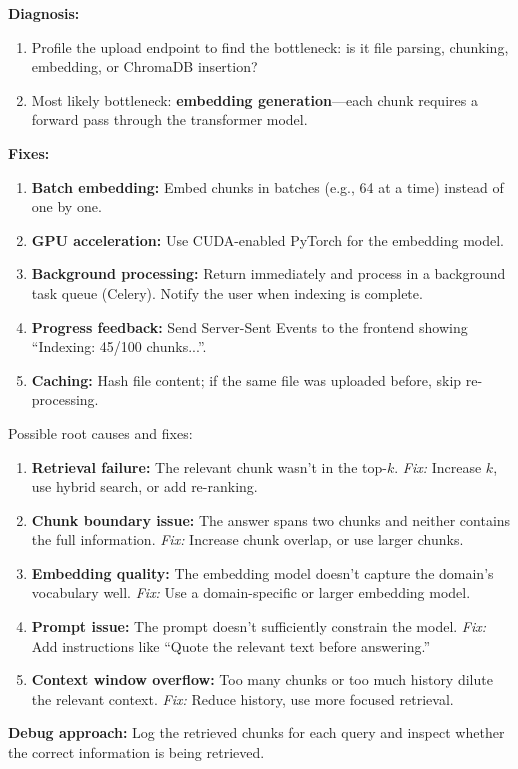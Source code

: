\documentclass[12pt,a4paper]{article}
\begin{document}
\begin{interviewbox}
\end{interviewbox}
\begin{answerbox}
\textbf{Diagnosis:}
\begin{enumerate}
  \item Profile the upload endpoint to find the bottleneck: is it file parsing, chunking, embedding, or ChromaDB insertion?
  \item Most likely bottleneck: \textbf{embedding generation}—each chunk requires a forward pass through the transformer model.
\end{enumerate}
\textbf{Fixes:}
\begin{enumerate}
  \item \textbf{Batch embedding:} Embed chunks in batches (e.g., 64 at a time) instead of one by one.
  \item \textbf{GPU acceleration:} Use CUDA-enabled PyTorch for the embedding model.
  \item \textbf{Background processing:} Return immediately and process in a background task queue (Celery). Notify the user when indexing is complete.
  \item \textbf{Progress feedback:} Send Server-Sent Events to the frontend showing ``Indexing: 45/100 chunks...''.
  \item \textbf{Caching:} Hash file content; if the same file was uploaded before, skip re-processing.
\end{enumerate}
\end{answerbox}

\begin{interviewbox}
\end{interviewbox}
\begin{answerbox}
Possible root causes and fixes:
\begin{enumerate}
  \item \textbf{Retrieval failure:} The relevant chunk wasn't in the top-$k$. \textit{Fix:} Increase $k$, use hybrid search, or add re-ranking.
  \item \textbf{Chunk boundary issue:} The answer spans two chunks and neither contains the full information. \textit{Fix:} Increase chunk overlap, or use larger chunks.
  \item \textbf{Embedding quality:} The embedding model doesn't capture the domain's vocabulary well. \textit{Fix:} Use a domain-specific or larger embedding model.
  \item \textbf{Prompt issue:} The prompt doesn't sufficiently constrain the model. \textit{Fix:} Add instructions like ``Quote the relevant text before answering.''
  \item \textbf{Context window overflow:} Too many chunks or too much history dilute the relevant context. \textit{Fix:} Reduce history, use more focused retrieval.
\end{enumerate}
\textbf{Debug approach:} Log the retrieved chunks for each query and inspect whether the correct information is being retrieved.
\end{answerbox}
\end{document}
